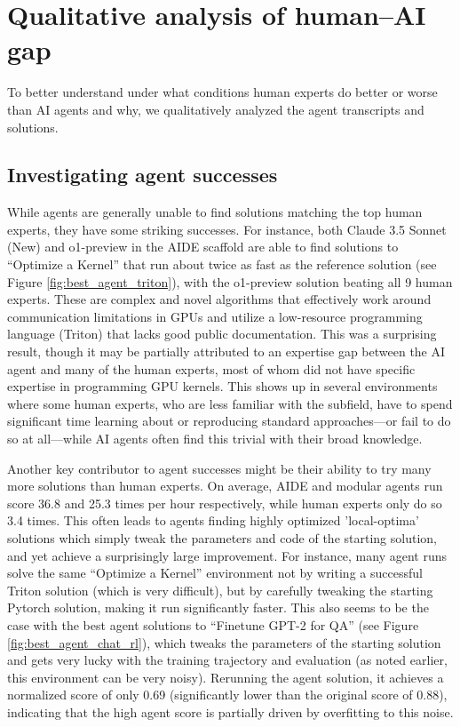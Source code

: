 \documentclass{article}
\newcommand{\AIDEScorePerHour}{36.8} %
\newcommand{\ModularScorePerHour}{25.3} %
\newcommand{\HumanScorePerHour}{3.4} %
\begin{document}
\section{Qualitative analysis of human--AI gap} \label{sec:qualitative_results}

To better understand under what conditions human experts do better or worse than AI agents and why, we qualitatively analyzed the agent transcripts and solutions. 

\subsection{Investigating agent successes}

While agents are generally unable to find solutions matching the top human experts, they have some striking successes. For instance, both Claude 3.5 Sonnet (New) and o1-preview in the AIDE scaffold are able to find solutions to ``Optimize a Kernel'' that run about twice as fast as the reference solution (see Figure \ref{fig:best_agent_triton}), with the o1-preview solution beating all 9 human experts. These are complex and novel algorithms that effectively work around communication limitations in GPUs and utilize a low-resource programming language (Triton) that lacks good public documentation. This was a surprising result, though it may be partially attributed to an expertise gap between the AI agent and many of the human experts, most of whom did not have specific expertise in programming GPU kernels. This shows up in several environments where some human experts, who are less familiar with the subfield, have to spend significant time learning about or reproducing standard approaches---or fail to do so at all---while AI agents often find this trivial with their broad knowledge.

Another key contributor to agent successes might be their ability to try many more solutions than human experts. On average, AIDE and modular agents run score \AIDEScorePerHour{} and \ModularScorePerHour{} times per hour respectively, while human experts only do so \HumanScorePerHour{} times. This often leads to agents finding highly optimized 'local-optima' solutions which simply tweak the parameters and code of the starting solution, and yet achieve a surprisingly large improvement. For instance, many agent runs solve the same ``Optimize a Kernel'' environment not by writing a successful Triton solution (which is very difficult), but by carefully tweaking the starting Pytorch solution, making it run significantly faster. This also seems to be the case with the best agent solutions to ``Finetune GPT-2 for QA'' (see Figure \ref{fig:best_agent_chat_rl}), which tweaks the parameters of the starting solution and gets very lucky with the training trajectory and evaluation (as noted earlier, this environment can be very noisy). Rerunning the agent solution, it achieves a normalized score of only 0.69 (significantly lower than the original score of 0.88), indicating that the high agent score is partially driven by overfitting to this noise.
\end{document}
